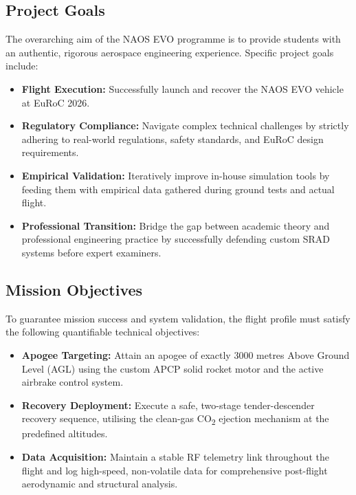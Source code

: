 \documentclass[11pt,a4paper]{article}
\begin{document}
\subsection{Project Goals}

The overarching aim of the NAOS EVO programme is to provide students with an authentic, rigorous aerospace engineering experience. Specific project goals include:
\begin{itemize}
    \item \textbf{Flight Execution:} Successfully launch and recover the NAOS EVO vehicle at EuRoC 2026.
    \item \textbf{Regulatory Compliance:} Navigate complex technical challenges by strictly adhering to real-world regulations, safety standards, and EuRoC design requirements.
    \item \textbf{Empirical Validation:} Iteratively improve in-house simulation tools by feeding them with empirical data gathered during ground tests and actual flight.
    \item \textbf{Professional Transition:} Bridge the gap between academic theory and professional engineering practice by successfully defending custom SRAD systems before expert examiners.
\end{itemize}

\subsection{Mission Objectives}

To guarantee mission success and system validation, the flight profile must satisfy the following quantifiable technical objectives:
\begin{itemize}
    \item \textbf{Apogee Targeting:} Attain an apogee of exactly 3000 metres Above Ground Level (AGL) using the custom APCP solid rocket motor and the active airbrake control system.
    \item \textbf{Recovery Deployment:} Execute a safe, two-stage tender-descender recovery sequence, utilising the clean-gas CO\textsubscript{2} ejection mechanism at the predefined altitudes.
    \item \textbf{Data Acquisition:} Maintain a stable RF telemetry link throughout the flight and log high-speed, non-volatile data for comprehensive post-flight aerodynamic and structural analysis.
\end{itemize}

\end{document}
